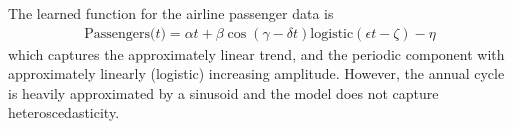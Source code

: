 The learned function for the airline passenger data is
\begin{align*}
\textrm{Passengers($t$)} = \alpha t + \beta\cos(\gamma - \delta t)\textrm{logistic}(\epsilon t - \zeta) - \eta
\end{align*}
which captures the approximately linear trend, and the periodic component with approximately linearly (logistic) increasing amplitude.
However, the annual cycle is heavily approximated by a sinusoid and the model does not capture heteroscedasticity.

\fi





